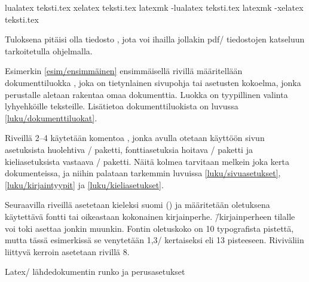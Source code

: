 \begin{koodilohkosis}
lualatex teksti.tex
xelatex  teksti.tex
latexmk -lualatex teksti.tex
latexmk -xelatex  teksti.tex
\end{koodilohkosis}

\noindent
Tuloksena pitäisi olla tiedosto , jota voi
ihailla jollakin pdf\-/ tiedostojen katseluun tarkoitetulla ohjelmalla.

Esimerkin \ref{esim/ensimmäinen} ensimmäisellä rivillä määritellään
dokumenttiluokka , joka on tietynlainen sivupohja tai
asetusten kokoelma, jonka perustalle aletaan rakentaa omaa dokumenttia.
Luokka  on tyypillinen valinta lyhyehköille teksteille.
Lisätietoa dokumenttiluokista on luvussa \ref{luku/dokumenttiluokat}.

Riveillä 2--4 käytetään komentoa , jonka avulla
otetaan käyttöön sivun asetuksista huolehtiva \-/
paketti, fonttiasetuksia hoitava \-/ paketti ja
kieliasetuksista vastaava \-/ paketti. Näitä kolmea
tarvitaan melkein joka kerta dokumenteissa, ja niihin palataan tarkemmin
luvuissa \ref{luku/sivuasetukset}, \ref{luku/kirjaintyypit} ja
\ref{luku/kieliasetukset}.

Seuraavilla riveillä asetetaan kieleksi suomi () ja
määritetään oletuksena käytettävä fontti tai oikeastaan kokonainen
kirjainperhe.  \=/kirjainperheen tilalle
voi toki asettaa jonkin muunkin. Fontin oletuskoko on 10 typografista
pistettä, mutta tässä esimerkissä se venytetään 1,3\-/ kertaiseksi eli
13 pisteeseen. Riviväliin liittyvä kerroin asetetaan rivillä 8.

\begin{esimerkki*}

  \caption{Latex\-/ lähdedokumentin runko ja perusasetukset}
  \label{esim/ensimmäinen}
\end{esimerkki*}


